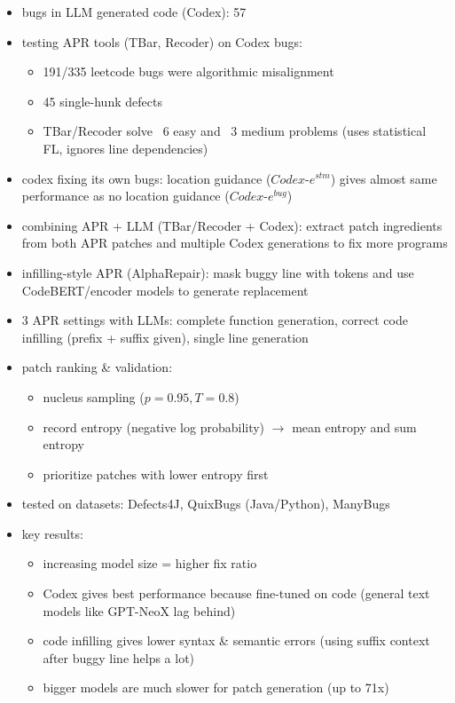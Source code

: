 \begin{itemize}
\item bugs in LLM generated code (Codex): 57%
\item testing APR tools (TBar, Recoder) on Codex bugs:
\begin{itemize}
\item 191/335 leetcode bugs were algorithmic misalignment
\item 45 single-hunk defects
\item TBar/Recoder solve ~6 easy and ~3 medium problems (uses statistical FL, ignores line dependencies)
\end{itemize}
\item codex fixing its own bugs: location guidance ($Codex\text{-}e^{stm}$) gives almost same performance as no location guidance ($Codex\text{-}e^{bug}$)
\item combining APR + LLM (TBar/Recoder + Codex): extract patch ingredients from both APR patches and multiple Codex generations to fix more programs
\item infilling-style APR (AlphaRepair): mask buggy line with tokens and use CodeBERT/encoder models to generate replacement
\item 3 APR settings with LLMs: complete function generation, correct code infilling (prefix + suffix given), single line generation
\item patch ranking & validation:
\begin{itemize}
\item nucleus sampling ($p=0.95, T=0.8$)
\item record entropy (negative log probability) $\rightarrow$ mean entropy and sum entropy
\item prioritize patches with lower entropy first
\end{itemize}
\item tested on datasets: Defects4J, QuixBugs (Java/Python), ManyBugs
\item key results:
\begin{itemize}
\item increasing model size = higher fix ratio
\item Codex gives best performance because fine-tuned on code (general text models like GPT-NeoX lag behind)
\item code infilling gives lower syntax & semantic errors (using suffix context after buggy line helps a lot)
\item bigger models are much slower for patch generation (up to 71x)
\end{itemize}
\end{itemize}

